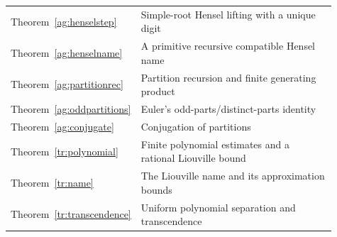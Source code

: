 \begin{longtable}{p{0.16\linewidth}p{0.75\linewidth}}
Theorem~\ref{ag:henselstep} & Simple-root Hensel lifting with a unique digit\\
Theorem~\ref{ag:henselname} & A primitive recursive compatible Hensel name\\
Theorem~\ref{ag:partitionrec} & Partition recursion and finite generating product\\
Theorem~\ref{ag:oddpartitions} & Euler's odd-parts/distinct-parts identity\\
Theorem~\ref{ag:conjugate} & Conjugation of partitions\\
Theorem~\ref{tr:polynomial} & Finite polynomial estimates and a rational Liouville bound\\
Theorem~\ref{tr:name} & The Liouville name and its approximation bounds\\
Theorem~\ref{tr:transcendence} & Uniform polynomial separation and transcendence\\
\bottomrule
\end{longtable}
